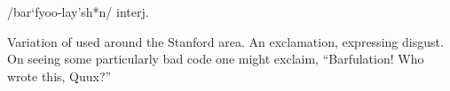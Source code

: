  /bar`fyoo-lay'sh*n/ interj.

Variation of  used around the Stanford area. An exclamation,
expressing disgust. On seeing some particularly bad code one might exclaim,
``Barfulation! Who wrote this, Quux?''

